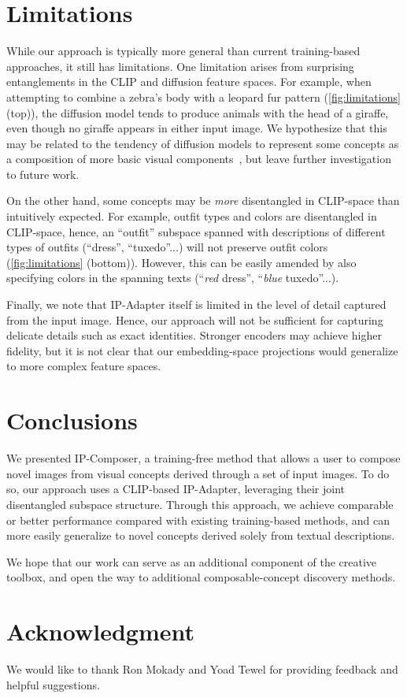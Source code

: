 

\section{Limitations}

While our approach is typically more general than current training-based approaches, it still has limitations. One limitation arises from surprising entanglements in the CLIP and diffusion feature spaces. For example, when attempting to combine a zebra's body with a leopard fur pattern (\cref{fig:limitations} (top)), the diffusion model tends to produce animals with the head of a giraffe, even though no giraffe appears in either input image. We hypothesize that this may be related to the tendency of diffusion models to represent some concepts as a composition of more basic visual components~\citep{chefer2023hidden}, but leave further investigation to future work.

On the other hand, some concepts may be \textit{more} disentangled in CLIP-space than intuitively expected. For example, outfit types and colors are disentangled in CLIP-space, hence, an ``outfit'' subspace spanned with descriptions of different types of outfits (``dress'', ``tuxedo''...) will not preserve outfit colors (\cref{fig:limitations} (bottom)). However, this can be easily amended by also specifying colors in the spanning texts (``\textit{red} dress'', ``\textit{blue} tuxedo''...).



Finally, we note that IP-Adapter itself is limited in the level of detail captured from the input image. Hence, our approach will not be sufficient for capturing delicate details such as exact identities. Stronger encoders may achieve higher fidelity, but it is not clear that our embedding-space projections would generalize to more complex feature spaces.

\section{Conclusions}

We presented IP-Composer, a training-free method that allows a user to compose novel images from visual concepts derived through a set of input images. To do so, our approach uses a CLIP-based IP-Adapter, leveraging their joint disentangled subspace structure. Through this approach, we achieve comparable or better performance compared with existing training-based methods, and can more easily generalize to novel concepts derived solely from textual descriptions. 

We hope that our work can serve as an additional component of the creative toolbox, and open the way to additional composable-concept discovery methods. 

\section{Acknowledgment}
We would like to thank Ron Mokady and Yoad Tewel for providing feedback and helpful suggestions.

